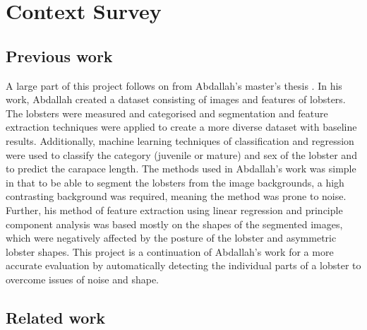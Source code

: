 \section{Context Survey}
\renewcommand{\imgpath}{tex/litreview/imgs}

\subsection{Previous work}
A large part of this project follows on from Abdallah's master's thesis \cite{lobster-thesis}. In his work, Abdallah created a dataset consisting of images and features of lobsters. The lobsters were measured and categorised and segmentation and feature extraction techniques were applied to create a more diverse dataset with baseline results.  Additionally, machine learning techniques of classification and regression were used to classify the category (juvenile or mature) and sex of the lobster and to predict the carapace length. 
\n
The methods used in Abdallah's work was simple in that to be able to segment the lobsters from the image backgrounds, a high contrasting background was required, meaning the method was prone to noise. Further, his method of feature extraction using linear regression and principle component analysis was based mostly on the shapes of the segmented images, which were negatively affected by the posture of the lobster and asymmetric lobster shapes. This project is a continuation of Abdallah's work for a more accurate evaluation by automatically detecting the individual parts of a lobster to overcome issues of noise and shape. 

\subsection{Related work}

